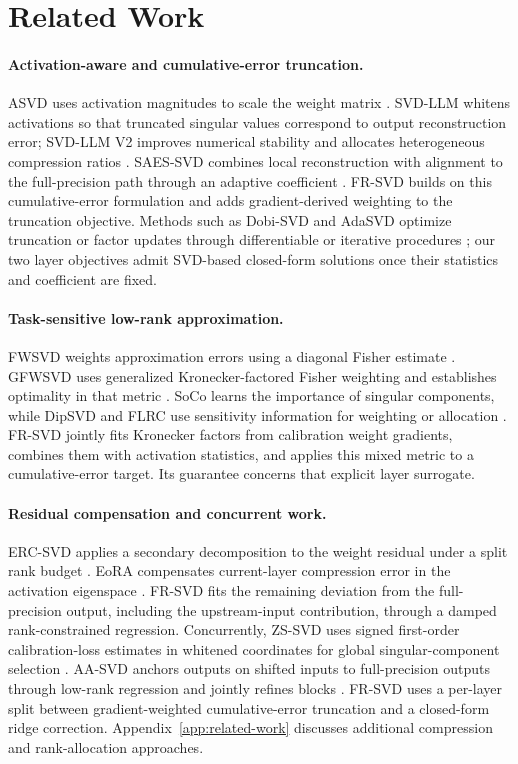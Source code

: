 \documentclass[11pt]{article}
\begin{document}
\section{Related Work}\label{sec:related-work}

\paragraph{Activation-aware and cumulative-error truncation.}
ASVD uses activation magnitudes to scale the weight matrix \citep{yuan2023asvd}. SVD-LLM whitens activations so that truncated singular values correspond to output reconstruction error; SVD-LLM V2 improves numerical stability and allocates heterogeneous compression ratios \citep{wang2025svdllm,wang2025svdllmv2}. SAES-SVD combines local reconstruction with alignment to the full-precision path through an adaptive coefficient \citep{hu2026saessvd}. FR-SVD builds on this cumulative-error formulation and adds gradient-derived weighting to the truncation objective. Methods such as Dobi-SVD and AdaSVD optimize truncation or factor updates through differentiable or iterative procedures \citep{wang2025dobisvd,li2025adasvd}; our two layer objectives admit SVD-based closed-form solutions once their statistics and coefficient are fixed.

\paragraph{Task-sensitive low-rank approximation.}
FWSVD weights approximation errors using a diagonal Fisher estimate \citep{hsu2022fwsvd}. GFWSVD uses generalized Kronecker-factored Fisher weighting and establishes optimality in that metric \citep{chekalina2025gfwsvd}. SoCo learns the importance of singular components, while DipSVD and FLRC use sensitivity information for weighting or allocation \citep{li2025soco,ding2025dipsvd,lu2025flrc}. FR-SVD jointly fits Kronecker factors from calibration weight gradients, combines them with activation statistics, and applies this mixed metric to a cumulative-error target. Its guarantee concerns that explicit layer surrogate.

\paragraph{Residual compensation and concurrent work.}
ERC-SVD applies a secondary decomposition to the weight residual under a split rank budget \citep{bai2025ercsvd}. EoRA compensates current-layer compression error in the activation eigenspace \citep{liu2025eora}. FR-SVD fits the remaining deviation from the full-precision output, including the upstream-input contribution, through a damped rank-constrained regression. Concurrently, ZS-SVD uses signed first-order calibration-loss estimates in whitened coordinates for global singular-component selection \citep{abbasi2026zssvd}. AA-SVD anchors outputs on shifted inputs to full-precision outputs through low-rank regression and jointly refines blocks \citep{sinha2026aasvd}. FR-SVD uses a per-layer split between gradient-weighted cumulative-error truncation and a closed-form ridge correction. Appendix~\ref{app:related-work} discusses additional compression and rank-allocation approaches.
\end{document}
